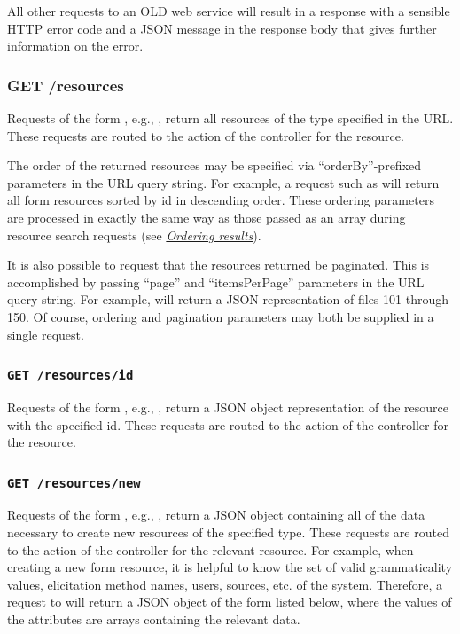 \documentclass[letterpaper,10pt,english]{sphinxmanual}
\begin{document}
All other requests to an OLD web service will result in a response with a
sensible HTTP error code and a JSON message in the response body that gives
further information on the error.


\subsubsection{GET /resources}
\label{interface:get-resources}\label{interface:id5}
Requests of the form , e.g., , return all
resources of the type specified in the URL.  These requests are routed to the
 action of the controller for the resource.

The order of the returned resources may be specified via ``orderBy''-prefixed
parameters in the URL query string.  For example, a request such as
 will
return all form resources sorted by id in descending order.  These ordering
parameters are processed in exactly the same way as those passed as an array
during resource search requests (see {\hyperref[interface:search-orderby]{\emph{Ordering results}}}).

It is also possible to request that the resources returned be paginated.  This
is accomplished by passing ``page'' and ``itemsPerPage'' parameters in the URL query
string.  For example,  will return a JSON
representation of files 101 through 150.  Of course, ordering and pagination
parameters may both be supplied in a single request.


\subsubsection{\texttt{GET /resources/id}}
\label{interface:get-resources-id}
Requests of the form , e.g., ,
return a JSON object representation of the resource with the specified id.
These requests are routed to the  action of the controller for the
resource.


\subsubsection{\texttt{GET /resources/new}}
\label{interface:get-resources-new}\label{interface:resources-new}
Requests of the form , e.g., , return a
JSON object containing all of the data necessary to create new resources of the
specified type.  These requests are routed to the  action of the
controller for the relevant resource.  For example, when creating a new form
resource, it is helpful to know the set of valid grammaticality values,
elicitation method names, users, sources, etc. of the system.  Therefore, a
request to  will return a JSON object of the form listed
below, where the values of the attributes are arrays containing the relevant
data.
\end{document}
